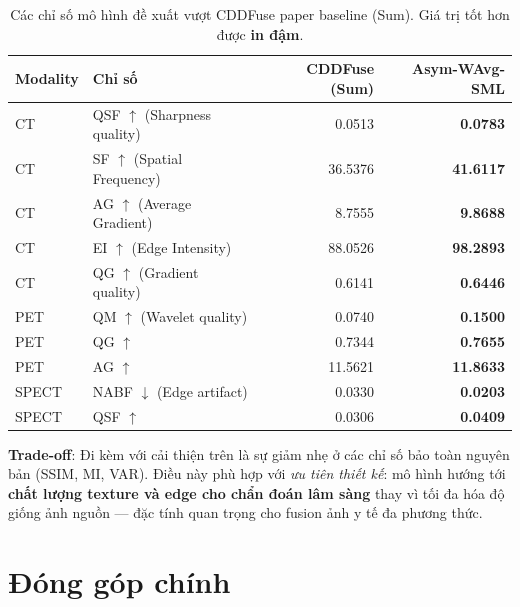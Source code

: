 \documentclass[12pt,a4paper]{article}
\begin{document}
\begin{table}[h]
\centering
\small
\setlength{\tabcolsep}{4pt}
\caption{Các chỉ số mô hình đề xuất vượt CDDFuse paper baseline (Sum). Giá trị tốt hơn được \textbf{in đậm}.}
\begin{tabular}{llrr}
\toprule
\textbf{Modality} & \textbf{Chỉ số} & \textbf{CDDFuse (Sum)} & \textbf{Asym-WAvg-SML} \\
\midrule
CT    & QSF $\uparrow$ (Sharpness quality)       & 0.0513  & \textbf{0.0783} \\
CT    & SF $\uparrow$ (Spatial Frequency)        & 36.5376 & \textbf{41.6117} \\
CT    & AG $\uparrow$ (Average Gradient)         & 8.7555  & \textbf{9.8688} \\
CT    & EI $\uparrow$ (Edge Intensity)           & 88.0526 & \textbf{98.2893} \\
CT    & QG $\uparrow$ (Gradient quality)         & 0.6141  & \textbf{0.6446} \\
PET   & QM $\uparrow$ (Wavelet quality)          & 0.0740  & \textbf{0.1500} \\
PET   & QG $\uparrow$                            & 0.7344  & \textbf{0.7655} \\
PET   & AG $\uparrow$                            & 11.5621 & \textbf{11.8633} \\
SPECT & NABF $\downarrow$ (Edge artifact)        & 0.0330  & \textbf{0.0203} \\
SPECT & QSF $\uparrow$                           & 0.0306  & \textbf{0.0409} \\
\bottomrule
\end{tabular}
\end{table}

\textbf{Trade-off}: Đi kèm với cải thiện trên là sự giảm nhẹ ở các chỉ số bảo toàn nguyên bản (SSIM, MI, VAR). Điều này phù hợp với \emph{ưu tiên thiết kế}: mô hình hướng tới \textbf{chất lượng texture và edge cho chẩn đoán lâm sàng} thay vì tối đa hóa độ giống ảnh nguồn --- đặc tính quan trọng cho fusion ảnh y tế đa phương thức.

\section{Đóng góp chính}
\end{document}
